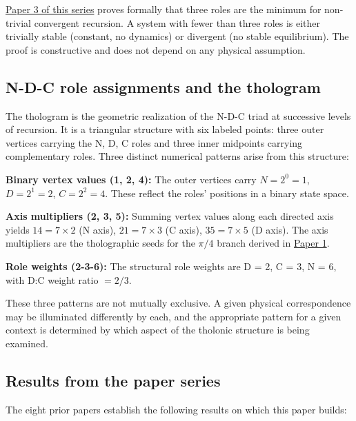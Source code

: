 \documentclass[12pt]{article}
\begin{document}
\href{https://github.com/baardev/truevalue/blob/main/docnav/Research/papers/3_minimal-recursive-triadic-framework/3_minimal-recursive-triadic-framework.pdf}{Paper
3 of this series} proves formally that three roles are the minimum for
non-trivial convergent recursion. A system with fewer than three roles
is either trivially stable (constant, no dynamics) or divergent (no
stable equilibrium). The proof is constructive and does not depend on
any physical assumption.

\subsection{N-D-C role assignments and the thologram}\label{n-d-c-role-assignments-and-the-thologram}

The thologram is the geometric realization of the N-D-C triad at
successive levels of recursion. It is a triangular structure with six
labeled points: three outer vertices carrying the N, D, C roles and
three inner midpoints carrying complementary roles. Three distinct
numerical patterns arise from this structure:

\textbf{Binary vertex values (1, 2, 4):} The outer vertices carry
\(N = 2^0 = 1\), \(D = 2^1 = 2\), \(C = 2^2 = 4\). These reflect the
roles' positions in a binary state space.

\textbf{Axis multipliers (2, 3, 5):} Summing vertex values along each
directed axis yields \(14 = 7 \times 2\) (N axis), \(21 = 7 \times 3\)
(C axis), \(35 = 7 \times 5\) (D axis). The axis multipliers are the
tholographic seeds for the \(\pi/4\) branch derived in
\href{https://github.com/baardev/truevalue/blob/main/docnav/Research/papers/1_recursive-tholonic-five-constants/1_recursive-tholonic-five-constants.pdf}{Paper
1}.

\textbf{Role weights (2-3-6):} The structural role weights are D = 2, C
= 3, N = 6, with D:C weight ratio \(= 2/3\).

These three patterns are not mutually exclusive. A given physical
correspondence may be illuminated differently by each, and the
appropriate pattern for a given context is determined by which aspect of
the tholonic structure is being examined.

\subsection{Results from the paper series}\label{results-from-the-paper-series}

The eight prior papers establish the following results on which this
paper builds:
\end{document}
